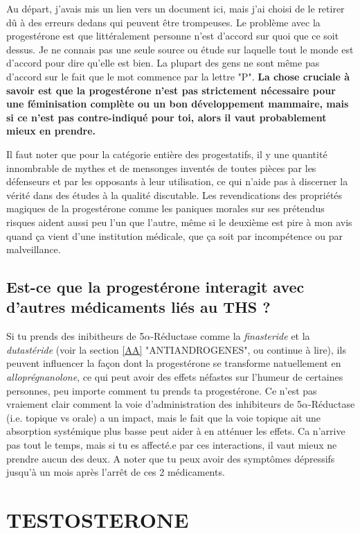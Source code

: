 \documentclass{article}
\begin{document}
Au départ, j'avais mis un lien vers un document ici, mais j'ai choisi de le retirer dû à des erreurs dedans qui peuvent être trompeuses. Le problème avec la progestérone est que littéralement personne n'est d'accord sur quoi que ce soit dessus. Je ne connais pas une seule source ou étude sur laquelle tout le monde est d'accord pour dire qu'elle est bien. La plupart des gens ne sont même pas d'accord sur le fait que le mot commence par la lettre "P". \textbf{La chose cruciale à savoir est que la progestérone n'est pas strictement nécessaire pour une féminisation complète ou un bon développement mammaire, mais si ce n'est pas contre-indiqué pour toi, alors il vaut probablement mieux en prendre.}

Il faut noter que pour la catégorie entière des progestatifs, il y une quantité innombrable de mythes et de mensonges inventés de toutes pièces par les défenseurs et par les opposants à leur utilisation, ce qui n'aide pas à discerner la vérité dans des études à la qualité discutable. Les revendications des propriétés magiques de la progestérone comme les paniques morales sur ses prétendus risques aident aussi peu l'un que l'autre, même si le deuxième est pire à mon avis quand ça vient d'une institution médicale, que ça soit par incompétence ou par malveillance.

\subsection{Est-ce que la progestérone interagit avec d'autres médicaments liés au THS ?}\label{8-18}

Si tu prends des inibitheurs de 5$\alpha$-Réductase comme la \textit{finasteride} et la \textit{dutastéride} (voir la section \ref{AA} "ANTIANDROGENES", ou continue à lire), ils peuvent influencer la façon dont la progestérone se transforme natuellement en \textit{alloprégnanolone}, ce qui peut avoir des effets néfastes sur l'humeur de certaines personnes, peu importe comment tu prends ta progestérone. Ce n'est pas vraiement clair comment la voie d'administration des inhibiteurs de 5$\alpha$-Réductase (i.e. topique vs orale) a un impact, mais le fait que la voie topique ait une absorption systémique plus basse peut aider à en atténuer les effets. Ca n'arrive pas tout le temps, mais si tu es affecté.e par ces interactions, il vaut mieux ne prendre aucun des deux. A noter que tu peux avoir des symptômes dépressifs jusqu'à un mois après l'arrêt de ces 2 médicaments.

\section{TESTOSTERONE}\label{T}
\end{document}
